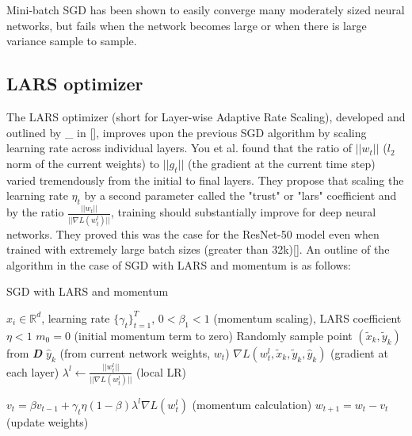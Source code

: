Mini-batch SGD has been shown to easily converge many moderately sized neural networks, but fails when the network becomes large or when there is large variance sample to sample.
\subsection{LARS optimizer}

The LARS optimizer (short for Layer-wise Adaptive Rate Scaling), developed and outlined by \_ in [], improves upon the previous SGD algorithm by scaling learning rate across individual layers. You et al. found that the ratio of $||w_t||$ ($l_2$ norm of the current weights) to $||g_t||$ (the gradient at the current time step) varied tremendously from the initial to final layers. They propose that scaling the learning rate $\eta_t$ by a second parameter called the "trust" or "lars" coefficient and by the ratio $\frac{||w_t||}{||\nabla L(w_t^l)||}$, training should substantially improve for deep neural networks. They proved this was the case for the ResNet-50 model even when trained with extremely large batch sizes (greater than 32k)[]. An outline of the algorithm in the case of SGD with LARS and momentum is as follows:
\begin{minipage}[b]{.48\textwidth}
\begin{algorithm}[H]\small
	\caption{SGD with LARS and momentum}
	\label{alg:lars}
	\begin{algorithmic}
	    \vspace{3pt}
		 $x_i \in \mathbb{R}^d$, learning rate $\{\gamma_t\}_{t=1}^T$, $0 < \beta_{1} < 1$ (momentum scaling), LARS coefficient $\eta <1$
		\vspace{3pt}
		\STATE $m_{0} = 0$ (initial momentum term to zero)
		\vspace{2pt}
		\STATE Randomly sample point $(\tilde x_k,\tilde y_k)$ from \textbf{\textit{D}}
        \vspace{3pt}
		\STATE $\hat y_k$ (from current network weights, $w_t$)
		\vspace{2pt}
        \STATE $\nabla L(w_t^l,\tilde x_k,\tilde y_k,\hat y_k)$ (gradient at each layer)
        \vspace{3pt}
        \STATE $\lambda^l \gets \frac{||w_t^l||}{||\nabla L(w_t^l)||}$ (local LR)
        \vspace{3pt}
        
        \STATE $v_{t} = \beta v_{t-1} + \gamma_t\eta(1 - \beta)\lambda^l\nabla L(w_t^l)$ (momentum calculation)
        \vspace{3pt}
		\STATE $w_{t+1} = w_{t} - v_t$ (update weights)
		\vspace{3pt}
		\ENDFOR
	\end{algorithmic}
\end{algorithm}
\end{minipage}\hfill%
